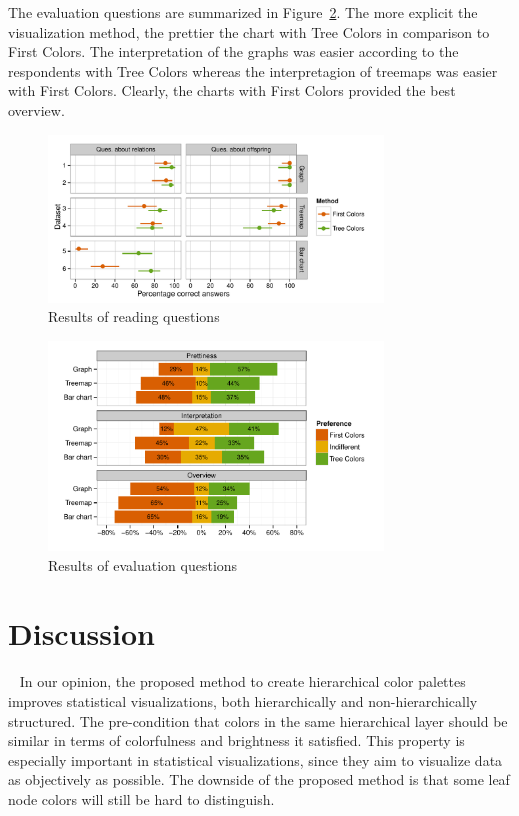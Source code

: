 \documentclass[journal]{vgtc}                %
\begin{document}
The evaluation questions are summarized in Figure~\ref{fig:user2}. The more explicit the visualization method, the prettier the chart with Tree Colors in comparison to First Colors. The interpretation of the graphs was easier according to the respondents with Tree Colors whereas the interpretagion of treemaps was easier with First Colors. Clearly, the charts with First Colors provided the best overview.








\begin{figure}[tb]
  \centering
	\includegraphics[width=3.5in]{user_study_results_mod.pdf}
  \caption{Results of reading questions}\label{fig:user1}

\end{figure}

\begin{figure}[tb]
  \centering
	\includegraphics[width=3.5in]{user_study_results2.pdf}
  \caption{Results of evaluation questions}\label{fig:user2}
\end{figure}

\section{Discussion}~\label{secdisc}
In our opinion, the proposed method to create hierarchical color palettes improves statistical visualizations, both hierarchically and non-hierarchically structured. The pre-condition that colors in the same hierarchical layer should be similar in terms of colorfulness and brightness it satisfied. This property is especially important in statistical visualizations, since they aim to visualize data as objectively as possible. The downside of the proposed method is that some leaf node colors will still be hard to distinguish.
\end{document}
